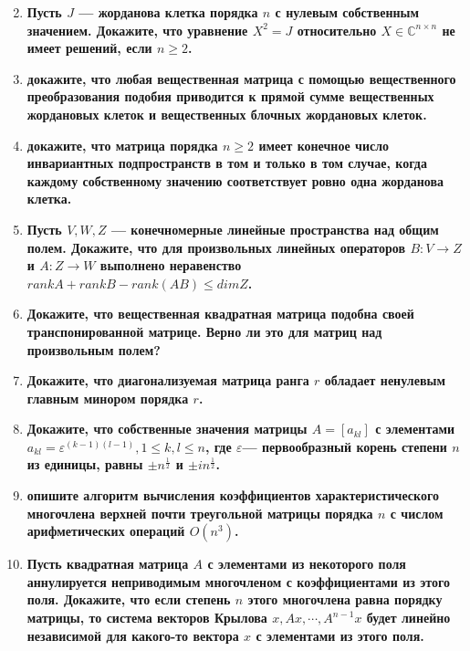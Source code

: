 \documentclass[12pt]{article} %
\begin{document}
\begin{enumerate}
{\[    \]
    }
    \item \textbf{Пусть $J$ --- жорданова клетка порядка $n$ с нулевым собственным значением. Докажите, что уравнение $X^2 = J$ относительно $X \in \mathds{C}^{n \times n}$ не имеет решений, если $n \geqslant 2$.}
    \item \textbf{докажите, что любая вещественная матрица с помощью вещественного преобразования подобия приводится к прямой сумме вещественных жордановых клеток и вещественных  блочных жордановых клеток.}
    \item \textbf{докажите, что матрица порядка $n \geqslant 2$ имеет конечное число инвариантных подпространств в том и только в том случае, когда каждому собственному значению соответствует ровно одна жорданова клетка.}
    \item \textbf{ Пусть $V, W ,Z$ --- конечномерные линейные пространства над общим полем. Докажите, что для произвольных линейных операторов $B : V \rightarrow Z$ и $A : Z \rightarrow W$ выполнено неравенство $rankA  + rankB - rank(AB) \leqslant dimZ$.}
    \item \textbf{Докажите, что вещественная квадратная матрица подобна своей транспонированной матрице. Верно ли это для матриц над произвольным полем?}
    \item \textbf{Докажите, что диагонализуемая матрица ранга $r$ обладает ненулевым главным минором порядка $r$.}
    \item \textbf{Докажите, что собственные значения матрицы $A = [a_{kl}]$ с элементами $a_{kl} = \varepsilon^{(k - 1)(l - 1)}, 1 \leqslant k, l \leqslant n$, где $\varepsilon$--- первообразный корень степени $n$ из единицы, равны $\pm n^{\frac{1}{2}}$ и $\pm in^{\frac{1}{2}}$.}
    \item \textbf{опишите алгоритм вычисления коэффициентов характеристического многочлена верхней почти треугольной матрицы порядка $n$ с числом арифметических операций $O(n^3)$.}
    \item \textbf{Пусть квадратная матрица $A$ с элементами из некоторого поля аннулируется неприводимым многочленом с коэффициентами из этого поля. Докажите, что если степень $n$ этого многочлена равна порядку матрицы, то система векторов Крылова $x, Ax, \cdots, A^{n-1}x$ будет линейно независимой для какого-то вектора $x$ с элементами из этого поля.}
\end{enumerate}
\end{document}
